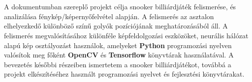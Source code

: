 \chapter{\bevezetes}

A dokumentumban szereplő projekt célja snooker billiárdjáték felismerése, és analizálása fénykép/képernyőfelvétel alapján. A felismerés az asztalon elhelyezkedő különböző színű golyók pozíciójának meghatározásából áll. A felismerés megvalósításához különféle képfeldolgozási eszközöket, neurális hálózat alapú kép osztályozást használok, amelyeket \textbf{Python} programozási nyelven valósítok meg főként \textbf{OpenCV} és \textbf{Tensorflow} könyvtárak használatával. A bevezetés későbbi részeiben ismertetem a snooker billiárdjátékot, továbbá a projekt elkészítéséhez használt programozási nyelvet és fejlesztési könyvtárakat.